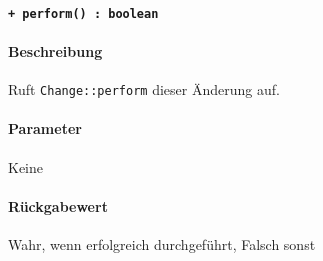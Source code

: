 \paragraph{\texttt{+ perform() : boolean}}%
\paragraph*{Beschreibung}
Ruft \verb#Change::perform# dieser Änderung auf.
\paragraph*{Parameter}
Keine
\paragraph*{Rückgabewert}
Wahr, wenn erfolgreich durchgeführt, Falsch sonst